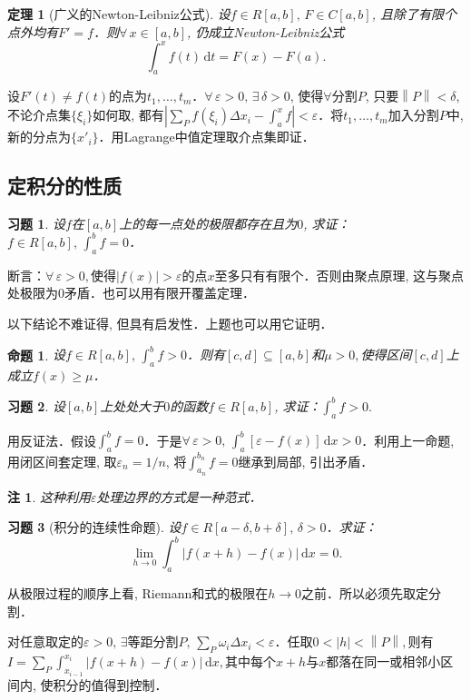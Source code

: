 \documentclass[11pt,a4paper]{ctexart}
\makeatletter
\theoremstyle{thmseries} %
\newtheorem{thm}{定理}[section]
\newtheorem{prop}{命题}[section]
\theoremstyle{exerseries}
\newtheorem{exer}{习题}[section]
\newtheorem*{rem}{注}
\renewenvironment{proof}[1][\proofname]{\par
  \pushQED{\qed}%
  \normalfont \topsep6\p@\@plus6\p@\relax
  \trivlist
  \item[\hskip\labelsep
        \itshape
    #1\@addpunct{}]\ignorespaces
}{%
  \popQED\endtrivlist\@endpefalse
}
\newenvironment{pf}{\begin{proof}[\bfseries\upshape 证\quad]}{\end{proof}}
\renewcommand{\epsilon}{\varepsilon}
\renewcommand{\d}{\mathrm{d}}
\newcommand{\norm}[1]{\left\lVert#1\right\rVert}
\makeatother
\begin{document}
\begin{thm}[广义的Newton-Leibniz公式]
	设$f\in R[a,b],\,F\in C[a,b]$, 且除了有限个点外均有$F'=f$．则$\forall\,x\in[a,b]$, 仍成立Newton-Leibniz公式
	\[\int_{a}^{x}f(t)\,\d t=F(x)-F(a).\]
\end{thm}
\begin{pf}
	设$F'(t)\neq f(t)$的点为$t_1,\dots,t_m$．$\forall\,\epsilon>0,\,\exists\,\delta>0$, 使得$\forall$分割$P$, 只要$\norm{P}<\delta$, 不论介点集$\{\xi_i\}$如何取, 都有$\left|\sum_P f(\xi_i)\Delta x_i-\int_{a}^{x}f\right|<\epsilon$．将$t_1,\dots,t_m$加入分割$P$中, 新的分点为$\{x'_i\}$．用Lagrange中值定理取介点集即证．
\end{pf}


\subsection{定积分的性质}
\begin{exer}
	设$f$在$[a,b]$上的每一点处的极限都存在且为$0$, 求证：$f\in R[a,b],\,\int_{a}^{b}f=0$．
\end{exer}
\begin{pf}
	断言：$\forall\,\epsilon>0,$使得$|f(x)|>\epsilon$的点$x$至多只有有限个．否则由聚点原理, 这与聚点处极限为0矛盾．也可以用有限开覆盖定理．
\end{pf}

以下结论不难证得, 但具有启发性．上题也可以用它证明．
\begin{prop}
	设$f\in R[a,b],\,\int_{a}^{b}f>0$．则有$[c,d]\subseteq[a,b]$和$\mu>0,$使得区间$[c,d]$上成立$f(x)\geq\mu$．
\end{prop}

\begin{exer}
	设$[a,b]$上处处大于$0$的函数$f\in R[a,b]$, 求证：$\int_{a}^{b}f>0.$
\end{exer}
\begin{pf}
	用反证法．假设$\int_{a}^{b}f=0$．于是$\forall\,\epsilon>0,\,\int_{a}^{b}[\epsilon-f(x)]\,\d x>0$．利用上一命题, 用闭区间套定理, 取$\epsilon_n=1/n$, 将$\int_{a_n}^{b_n}f=0$继承到局部, 引出矛盾．
\end{pf}
\begin{rem}
	这种利用$\epsilon$处理边界的方式是一种范式．
\end{rem}

\begin{exer}[积分的连续性命题]
	设$f\in R[a-\delta,b+\delta],\,\delta>0$．求证：
	\[\lim_{h\to0}\int_{a}^{b}|f(x+h)-f(x)|\,\d x=0.\]
\end{exer}
\begin{pf}
	从极限过程的顺序上看, Riemann和式的极限在$h\to0$之前．所以必须先取定分割．
	
	对任意取定的$\epsilon>0,\,\exists$等距分割$P,\,\sum_P \omega_i\Delta x_i<\epsilon$．任取$0<|h|<\norm{P},$则有
	$I=\sum_P \int_{x_{i-1}}^{x_i}|f(x+h)-f(x)|\,\d x,$其中每个$x+h$与$x$都落在同一或相邻小区间内, 使积分的值得到控制．
\end{pf}
\end{document}
